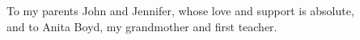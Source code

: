 \clearpage
\centering
\vspace*{-\toptafiddle}

To my parents John and Jennifer, whose love and support is absolute,
\\
and to Anita Boyd, my grandmother and first teacher.

\enlargethispage{\bottafiddle}
\clearpage
